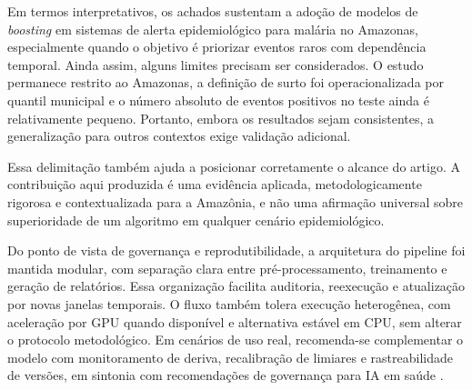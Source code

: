 Em termos interpretativos, os achados sustentam a ado\c{c}\~ao de modelos de \textit{boosting} em sistemas de alerta epidemiol\'ogico para mal\'aria no Amazonas, especialmente quando o objetivo \'e priorizar eventos raros com depend\^encia temporal. Ainda assim, alguns limites precisam ser considerados. O estudo permanece restrito ao Amazonas, a defini\c{c}\~ao de surto foi operacionalizada por quantil municipal e o n\'umero absoluto de eventos positivos no teste ainda \'e relativamente pequeno. Portanto, embora os resultados sejam consistentes, a generaliza\c{c}\~ao para outros contextos exige valida\c{c}\~ao adicional.

Essa delimita\c{c}\~ao tamb\'em ajuda a posicionar corretamente o alcance do artigo. A contribui\c{c}\~ao aqui produzida \'e uma evid\^encia aplicada, metodologicamente rigorosa e contextualizada para a Amaz\^onia, e n\~ao uma afirma\c{c}\~ao universal sobre superioridade de um algoritmo em qualquer cen\'ario epidemiol\'ogico.

Do ponto de vista de governan\c{c}a e reprodutibilidade, a arquitetura do pipeline foi mantida modular, com separa\c{c}\~ao clara entre pr\'e-processamento, treinamento e gera\c{c}\~ao de relat\'orios. Essa organiza\c{c}\~ao facilita auditoria, reexecu\c{c}\~ao e atualiza\c{c}\~ao por novas janelas temporais. O fluxo tamb\'em tolera execu\c{c}\~ao heterog\^enea, com acelera\c{c}\~ao por GPU quando dispon\'ivel e alternativa est\'avel em CPU, sem alterar o protocolo metodol\'ogico. Em cen\'arios de uso real, recomenda-se complementar o modelo com monitoramento de deriva, recalibra\c{c}\~ao de limiares e rastreabilidade de vers\~oes, em sintonia com recomenda\c{c}\~oes de governan\c{c}a para IA em sa\'ude \cite{world2024ethics}.
